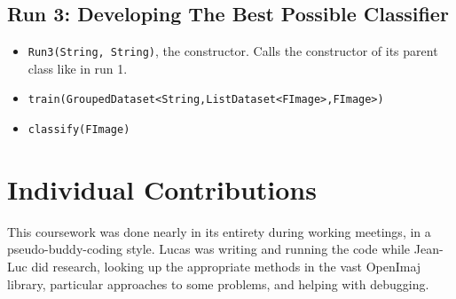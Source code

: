 \documentclass[a4paper,12pt]{article}
\begin{document}
\subsection{Run 3: Developing The Best Possible Classifier}
\begin{itemize}
	\item \texttt{Run3(String, String)}, the constructor. Calls the constructor of its parent class like in run 1.
	\item \texttt{train(GroupedDataset<String,ListDataset<FImage>,FImage>)}
	\item \texttt{classify(FImage)}
\end{itemize}

\section{Individual Contributions}
This coursework was done nearly in its entirety during working meetings, in a pseudo-buddy-coding style. Lucas was writing and running the code while Jean-Luc did research, looking up the appropriate methods in the vast OpenImaj library, particular approaches to some problems, and helping with debugging.
\end{document}
